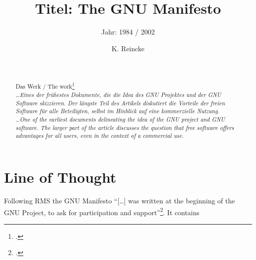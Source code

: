\documentclass[DIV=calc,BCOR=5mm,11pt,headings=small,oneside,abstract=true, toc=bib]{scrartcl}
\begin{document}

\titlehead{Literaturexzerpt}
\subject{Autor(en): Stallman / Stallman1984a}
\title{Titel: The GNU Manifesto}
\subtitle{Jahr: 1984 / 2002 }
\author{K. Reincke}

\maketitle

\begin{abstract}
\noindent
\cite[(in:)][]{StaGay2002a} \\
\noindent
\cite[(ist:)][]{Stallman1984a} \\
Das Werk / The work\footcite[][]{Stallman1984a} \\
\noindent \itshape
\ldots Eines der frühestes Dokumente, die die Idea des GNU Projektes und der GNU
Software skizzieren. Der längste Teil des Artikels diskutiert die Vorteile der
freien Software für alle Beteiligten, selbst im Hinblick auf eine kommerzielle
Nutzung.
\\
\noindent
\ldots One of the earliest documents delineating the idea of the GNU project and
GNU software. The larger part of the article discusses the question that free
software offers advantages for all users, even in the context of a commercial
use.
\end{abstract}
\footnotesize
\normalsize

\section{Line of Thought}
Following RMS the GNU Manifesto \enquote{[\ldots] was written at the
beginning of the GNU Project, to ask for participation and
support}\footcite[cf.][31]{Stallman1984a}. It contains
\end{document}

